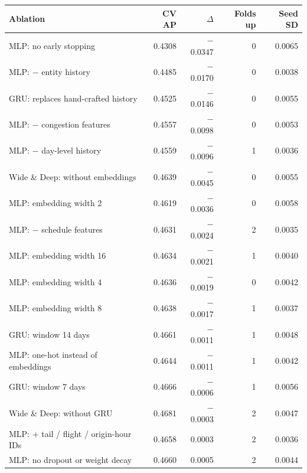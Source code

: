 \begin{tabular}{lrrrr}
\toprule
Ablation & CV AP & $\Delta$ & Folds up & Seed SD \\
\midrule
MLP: no early stopping & 0.4308 & $-$0.0347 & 0 & 0.0065 \\
MLP: $-$ entity history & 0.4485 & $-$0.0170 & 0 & 0.0038 \\
GRU: replaces hand-crafted history & 0.4525 & $-$0.0146 & 0 & 0.0055 \\
MLP: $-$ congestion features & 0.4557 & $-$0.0098 & 0 & 0.0053 \\
MLP: $-$ day-level history & 0.4559 & $-$0.0096 & 1 & 0.0036 \\
Wide \& Deep: without embeddings & 0.4639 & $-$0.0045 & 0 & 0.0055 \\
MLP: embedding width 2 & 0.4619 & $-$0.0036 & 0 & 0.0058 \\
MLP: $-$ schedule features & 0.4631 & $-$0.0024 & 2 & 0.0035 \\
MLP: embedding width 16 & 0.4634 & $-$0.0021 & 1 & 0.0040 \\
MLP: embedding width 4 & 0.4636 & $-$0.0019 & 0 & 0.0042 \\
MLP: embedding width 8 & 0.4638 & $-$0.0017 & 1 & 0.0037 \\
GRU: window 14 days & 0.4661 & $-$0.0011 & 1 & 0.0048 \\
MLP: one-hot instead of embeddings & 0.4644 & $-$0.0011 & 1 & 0.0042 \\
GRU: window 7 days & 0.4666 & $-$0.0006 & 1 & 0.0056 \\
Wide \& Deep: without GRU & 0.4681 & $-$0.0003 & 2 & 0.0047 \\
MLP: + tail / flight / origin-hour IDs & 0.4658 & 0.0003 & 2 & 0.0036 \\
MLP: no dropout or weight decay & 0.4660 & 0.0005 & 2 & 0.0044 \\
\bottomrule
\end{tabular}

